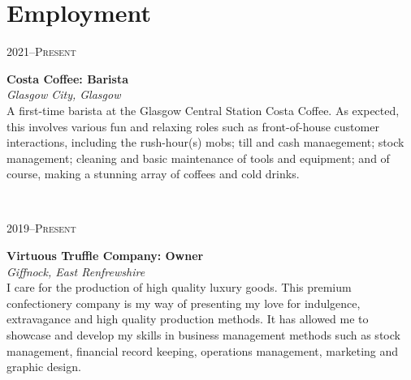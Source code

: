 \documentclass[11pt, english]{article}
\begin{document}
{\section{Employment}

\begin{minipage}[t]{.15\linewidth}
	\hfill
	\textsc{2021--Present}
\end{minipage}
\hfill\vline\hfill
\begin{minipage}[t]{.80\linewidth}
	\textbf{Costa Coffee: Barista}\\
	\textit{Glasgow City, Glasgow}\\
	A first-time barista at the Glasgow Central Station Costa Coffee. As expected, this involves various fun and relaxing roles such as front-of-house customer interactions, including the rush-hour(s) mobs; till and cash manaegement; stock management; cleaning and basic maintenance of tools and equipment; and of course, making a stunning array of coffees and cold drinks.
\end{minipage}\\
\vspace{0.25cm}

\begin{minipage}[t]{.15\linewidth}
        \hfill 
        \textsc{2019--Present}
\end{minipage}
\hfill\vline\hfill
\begin{minipage}[t]{.80\linewidth}
        \textbf{Virtuous Truffle Company: Owner}\\
	\textit{Giffnock, East Renfrewshire}\\ 
	I care for the production of high quality luxury goods. This premium confectionery company is my way of presenting my love for indulgence, extravagance and high quality production methods. It has allowed me to showcase and develop my skills in business management methods such as stock management, financial record keeping, operations management, marketing and graphic design.
\end{minipage}\\
\vspace{0.25cm}

}
\end{document}

